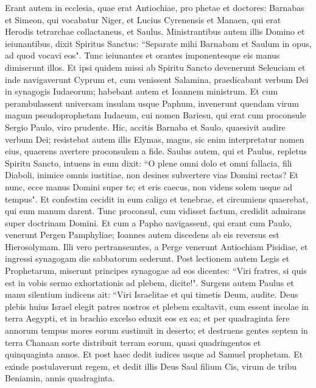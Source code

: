 \begin{biblechapter}  
\verse Erant autem in ecclesia, quae erat Antiochiae, pro phetae et doctores: Barnabas et Simeon, qui vocabatur Niger, et Lucius Cyrenensis et Manaen, qui erat Herodis tetrarchae collactaneus, et Saulus. 
\verse Ministrantibus autem illis Domino et ieiunantibus, dixit Spiritus Sanctus: “Separate mihi Barnabam et Saulum in opus, ad quod vocavi eos". 
\verse Tunc ieiunantes et orantes imponentesque eis manus dimiserunt illos. 
\verse Et ipsi quidem missi ab Spiritu Sancto devenerunt Seleuciam et inde navigaverunt Cyprum 
\verse et, cum venissent Salamina, praedicabant verbum Dei in synagogis Iudaeorum; habebant autem et Ioannem ministrum. 
\verse Et cum perambulassent universam insulam usque Paphum, invenerunt quendam virum magum pseudoprophetam Iudaeum, cui nomen Bariesu, 
\verse qui erat cum proconsule Sergio Paulo, viro prudente. Hic, accitis Barnaba et Saulo, quaesivit audire verbum Dei; 
\verse resistebat autem illis Elymas, magus, sic enim interpretatur nomen eius, quaerens avertere proconsulem a fide. 
\verse Saulus autem, qui et Paulus, repletus Spiritu Sancto, intuens in eum 
\verse dixit: “O plene omni dolo et omni fallacia, fili Diaboli, inimice omnis iustitiae, non desines subvertere vias Domini rectas? 
\verse Et nunc, ecce manus Domini super te; et eris caecus, non videns solem usque ad tempus". Et confestim cecidit in eum caligo et tenebrae, et circumiens quaerebat, qui eum manum darent. 
\verse Tunc proconsul, cum vidisset factum, credidit admirans super doctrinam Domini. 
\verse Et cum a Papho navigassent, qui erant cum Paulo, venerunt Pergen Pamphyliae; Ioannes autem discedens ab eis reversus est Hierosolymam. 
\verse Illi vero pertranseuntes, a Perge venerunt Antiochiam Pisidiae, et ingressi synagogam die sabbatorum sederunt. 
\verse Post lectionem autem Legis et Prophetarum, miserunt principes synagogae ad eos dicentes: “Viri fratres, si quis est in vobis sermo exhortationis ad plebem, dicite!". 
\verse Surgens autem Paulus et manu silentium indicens ait: “Viri Israelitae et qui timetis Deum, audite. 
\verse Deus plebis huius Israel elegit patres nostros et plebem exaltavit, cum essent incolae in terra Aegypti, et in brachio excelso eduxit eos ex ea; 
\verse et per quadraginta fere annorum tempus mores eorum sustinuit in deserto; 
\verse et destruens gentes septem in terra Chanaan sorte distribuit terram eorum, 
\verse quasi quadringentos et quinquaginta annos. Et post haec dedit iudices usque ad Samuel prophetam. 
\verse Et exinde postulaverunt regem, et dedit illis Deus Saul filium Cis, virum de tribu Beniamin, annis quadraginta. 

\end{biblechapter}
